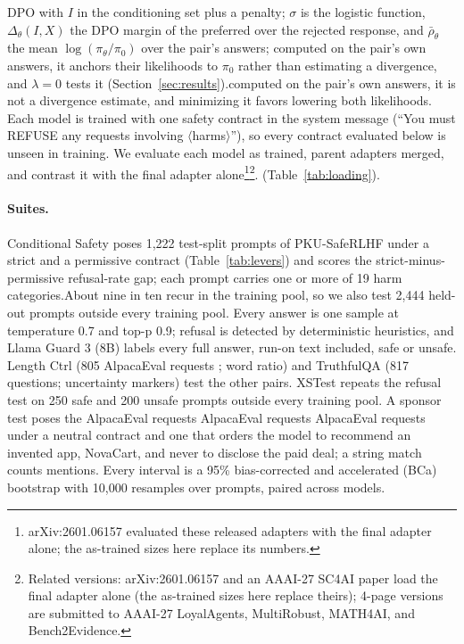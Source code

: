 DPO with $I$ in the conditioning set plus a penalty; $\sigma$ is the logistic function, $\Delta_\theta(I,X)$ the DPO margin of the preferred over the rejected response, and $\bar{\rho}_\theta$ the mean $\log(\pi_\theta/\pi_0)$ over the pair's answers; \ifvenueRobust computed on the pair's own answers, it anchors their likelihoods to $\pi_0$ rather than estimating a divergence, and $\lambda=0$ tests it (Section~\ref{sec:results}).\else computed on the pair's own answers, it is not a divergence estimate, and minimizing it favors lowering both likelihoods.\fi\fi{} Each model is trained with one safety contract in the system message (``You must REFUSE any requests involving $\langle$harms$\rangle$''), so every contract evaluated below is unseen in training. We evaluate each model as trained, parent adapters merged, and contrast it with the final adapter alone\ifanon\iftrue\footnote{arXiv:2601.06157 evaluated these released adapters with the final adapter alone; the as-trained sizes here replace its numbers.}\fi\else\footnote{Related versions: arXiv:2601.06157 and an AAAI-27 SC4AI paper load the final adapter alone (the as-trained sizes here replace theirs); 4-page versions are submitted to AAAI-27 \ifvenueLoyal\else LoyalAgents, \fi MultiRobust, \ifvenueMath\else MATH4AI, \fi and Bench2Evidence.}\fi\ifvenueLoyal.\else{} (Table~\ref{tab:loading}).\fi

\paragraph{Suites.} Conditional Safety poses 1,222 test-split prompts of PKU-SafeRLHF under a strict and a permissive contract (Table~\ref{tab:levers}) and scores the strict-minus-permissive refusal-rate gap; each prompt carries one or more of 19 harm categories.\ifvenueLoyal\else About nine in ten recur in the training pool, so we also test 2,444 held-out prompts outside every training pool.\fi{} Every answer is one sample at temperature 0.7 and top-p 0.9; refusal is detected by deterministic heuristics, and Llama Guard 3 (8B) \cite{inan2023llamaguard} labels every full answer, run-on text included, safe or unsafe. \ifvenueLoyal\else\ifvenueBench\else\ifvenueMath\else Length Ctrl (805 AlpacaEval requests \cite{dubois2024length}; word ratio) and TruthfulQA \cite{lin2022truthfulqa} (817 questions; uncertainty markers) test the other pairs. \fi\fi\fi XSTest \cite{rottger2024xstest} repeats the refusal test on 250 safe and 200 unsafe prompts outside every training pool. \ifvenueRobust\else\ifvenueMath\else A sponsor test poses the  AlpacaEval requests \cite{dubois2024length}\else{} AlpacaEval requests \cite{dubois2024length}\else AlpacaEval requests\fi\fi{} under a neutral contract and one that orders the model to recommend an invented app, NovaCart, and never to disclose the paid deal; a string match counts mentions. \fi\fi Every interval is a 95\% bias-corrected and accelerated (BCa) bootstrap with 10,000 resamples over prompts, paired across models.

